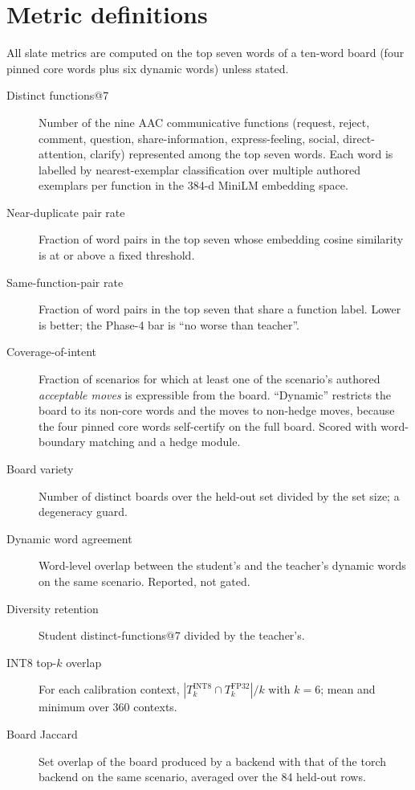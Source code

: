 \documentclass{article}
\begin{document}
\section{Metric definitions}\label{app:metrics}

All slate metrics are computed on the top seven words of a ten-word board (four
pinned core words plus six dynamic words) unless stated.

\begin{description}
\item[Distinct functions@7] Number of the nine AAC communicative functions
(request, reject, comment, question, share-information, express-feeling, social,
direct-attention, clarify) represented among the top seven words. Each word is
labelled by nearest-exemplar classification over multiple authored exemplars per
function in the 384-d MiniLM embedding space.
\item[Near-duplicate pair rate] Fraction of word pairs in the top seven whose
embedding cosine similarity is at or above a fixed threshold.
\item[Same-function-pair rate] Fraction of word pairs in the top seven that share
a function label. Lower is better; the Phase-4 bar is ``no worse than teacher''.
\item[Coverage-of-intent] Fraction of scenarios for which at least one of the
scenario's authored \emph{acceptable moves} is expressible from the board.
``Dynamic'' restricts the board to its non-core words and the moves to
non-hedge moves, because the four pinned core words self-certify on the full
board. Scored with word-boundary matching and a hedge module.
\item[Board variety] Number of distinct boards over the held-out set divided by
the set size; a degeneracy guard.
\item[Dynamic word agreement] Word-level overlap between the student's and the
teacher's dynamic words on the same scenario. Reported, not gated.
\item[Diversity retention] Student distinct-functions@7 divided by the teacher's.
\item[INT8 top-$k$ overlap] For each calibration context, $|T_k^{\mathrm{INT8}}
\cap T_k^{\mathrm{FP32}}|/k$ with $k{=}6$; mean and minimum over 360 contexts.
\item[Board Jaccard] Set overlap of the board produced by a backend with that of
the torch backend on the same scenario, averaged over the 84 held-out rows.
\end{description}
\end{document}
